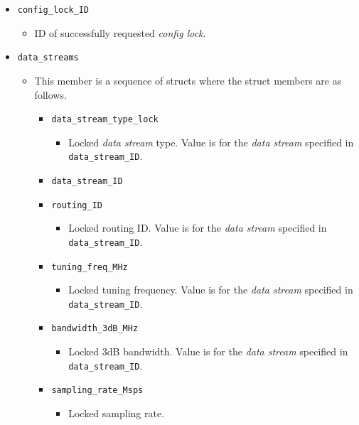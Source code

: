 \documentclass{article}
\begin{document}
  \begin{itemize}
    \item \verb+config_lock_ID+
      \begin{itemize}
        \item ID of successfully requested \textit{config lock}.
      \end{itemize}
    \item \verb+data_streams+
      \begin{itemize}
        \item This member is a sequence of structs where the struct members are as follows.
          \begin{itemize}
            \item \verb+data_stream_type_lock+
              \begin{itemize}
                \item Locked \textit{data stream} type.
                  Value is for the \textit{data stream} specified in
                  \verb+data_stream_ID+.
              \end{itemize}
            \item \verb+data_stream_ID+
            \item \verb+routing_ID+
              \begin{itemize}
                \item Locked routing ID.
                  Value is for the \textit{data stream} specified in
                  \verb+data_stream_ID+.
              \end{itemize}
            \item \verb+tuning_freq_MHz+
              \begin{itemize}
                \item Locked tuning frequency.
                  Value is for the \textit{data stream} specified in
                  \verb+data_stream_ID+.
              \end{itemize}
            \item \verb+bandwidth_3dB_MHz+
              \begin{itemize}
                \item Locked 3dB bandwidth.
                  Value is for the \textit{data stream} specified in
                  \verb+data_stream_ID+.
              \end{itemize}
            \item \verb+sampling_rate_Msps+
              \begin{itemize}
                \item Locked sampling rate.

\end{itemize}
\end{itemize}
\end{itemize}
\end{itemize}
\end{document}
